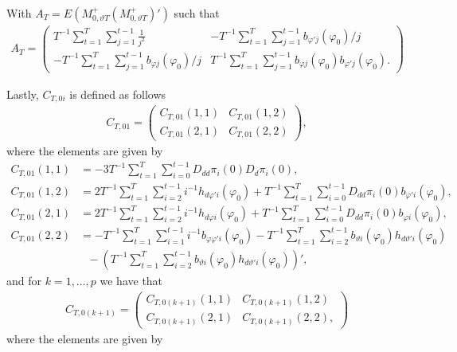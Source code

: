 {{With $ A_T = E\left(M^+_{0,\vartheta T} (M^+_{0,\vartheta T})' \right)$  such that 
\begin{align*}
    A_T = \begin{pmatrix}
 T^{-1}  \sum_{t = 1}^T \sum_{j = 1}^{t-1} \frac{1}{j^2}  & - T^{-1}  \sum_{t = 1}^T \sum_{j = 1}^{t-1} b_{\varphi' j}(\varphi_0)/j \\
- T^{-1}  \sum_{t = 1}^T \sum_{j = 1}^{t-1} b_{\varphi j}(\varphi_0)/j  & T^{-1}  \sum_{t = 1}^T \sum_{j = 1}^{t-1} b_{\varphi j}(\varphi_0) b_{\varphi' j}(\varphi_0).
\end{pmatrix} 
\end{align*}

Lastly, $C_{T,0i}$ is defined as follows 
\begin{align*}
C_{T,01} = \begin{pmatrix}
 C_{T,01}(1,1)  & C_{T,01}(1,2) \\
C_{T,01}(2,1) & C_{T,01}(2,2)
\end{pmatrix}, 
\end{align*}
where the elements are given by
\begin{align*}
     C_{T,01}(1,1) &= -3 T^{-1} \sum_{t = 1}^T \sum_{i = 0}^{t-1}  D_{dd} \pi_i(0)  D_{d} \pi_i(0), \\
     C_{T,01}(1,2) &= 2 T^{-1} \sum_{t = 1}^T \sum_{i = 2}^{t-1}  i^{-1} h_{d \varphi' i}(\varphi_0) + T^{-1} \sum_{t = 1}^T \sum_{i = 0}^{t-1}  D_{dd} \pi_i(0) b_{\varphi'i}(\varphi_0),\\
     C_{T,01}(2,1) &= 2 T^{-1} \sum_{t = 1}^T \sum_{i = 2}^{t-1}  i^{-1} h_{d \varphi i}(\varphi_0) + T^{-1} \sum_{t = 1}^T \sum_{i = 0}^{t-1}  D_{dd} \pi_i(0) b_{\varphi i}(\varphi_0),\\
     C_{T,01}(2,2) &=  -T^{-1} \sum_{t = 1}^T \sum_{i = 1}^{t-1}  i^{-1} b_{\varphi \varphi'i}(\varphi_0) -T^{-1} \sum_{t = 1}^T \sum_{i = 2}^{t-1}    b_{\vartheta i}(\varphi_0) h_{d \vartheta' i}(\varphi_0) \\
     &\ \ \ - \left(T^{-1} \sum_{t = 1}^T \sum_{i = 2}^{t-1}    b_{\vartheta i}(\varphi_0) h_{d \vartheta' i}(\varphi_0)\right)',
\end{align*}
and for $k = 1,\dots, p$ we have that
\begin{align*}
C_{T,0(k+1)} = \begin{pmatrix}
 C_{T,0(k+1)}(1,1)  & C_{T,0(k+1)}(1,2) \\
C_{T,0(k+1)}(2,1) & C_{T,0(k+1)}(2,2),
\end{pmatrix}  
\end{align*}
where the elements are given by
}}
